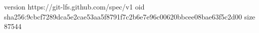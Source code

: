 version https://git-lfs.github.com/spec/v1
oid sha256:9cbcf7289dca5e2cae53aa5f8791f7c2b6e7e96c00620bbcee08bae63f5c2d00
size 87544

